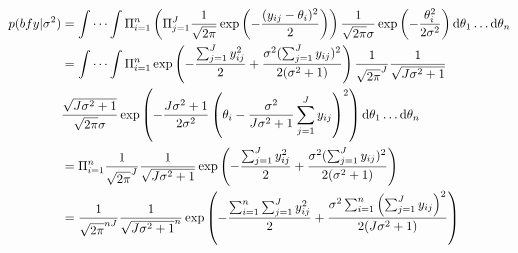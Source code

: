 \documentclass{article}
\begin{document}
	\subsection{}
		\begin{align*}
		p({bf y} | \sigma^2) &= \idotsint \Pi_{i = 1}^{n} \left(\Pi_{j=1}^{J} \frac{1}{\sqrt{2\pi}} \exp\left( -\frac{(y_{ij} - \theta_i)^2}{2}\right) \right)\frac{1}{\sqrt{2\pi}\sigma} \exp\left( -\frac{\theta_i^2}{2\sigma^2}\right)\mathrm{d}\theta_1 \dots \mathrm{d}\theta_n \\
		&= \idotsint \Pi_{i = 1}^{n} \exp\left( -\frac{\sum_{j=1}^{J} y_{ij}^2}{2} + \frac{\sigma^2 (\sum_{j=1}^{J} y_{ij})^2}{2(\sigma^2 + 1)} \right) \frac{1}{\sqrt{2\pi}^J} \frac{1}{\sqrt{J\sigma^2 + 1}} \\ &\frac{\sqrt{J\sigma^2 + 1}}{\sqrt{2\pi}\sigma} \exp\left(-\frac{J\sigma^2 + 1}{2\sigma^2} \left( \theta_i - \frac{\sigma^2}{J\sigma^2 + 1} \sum_{j=1}^{J} y_{ij} \right)^2\right)\mathrm{d}\theta_1 \dots \mathrm{d}\theta_n \\
		&= \Pi_{i=1}^{n} \frac{1}{\sqrt{2\pi}^J} \frac{1}{\sqrt{J\sigma^2 + 1}} \exp\left( -\frac{\sum_{j=1}^{J} y_{ij}^2}{2} + \frac{\sigma^2 (\sum_{j=1}^{J} y_{ij})^2}{2(\sigma^2 + 1)} \right)\\
		&= \frac{1}{\sqrt{2\pi}^{nJ}} \frac{1}{\sqrt{J\sigma^2 + 1}^{n}} \exp\left( -\frac{\sum_{i=1}^{n} \sum_{j=1}^{J} y_{ij}^2}{2} + \frac{\sigma^2 \sum_{i=1}^{n} \left( \sum_{j=1}^{J} y_{ij}\right)^2}{2(J\sigma^2+ 1)}\right)\\
		\end{align*}
	\subsection{}
\end{document}
